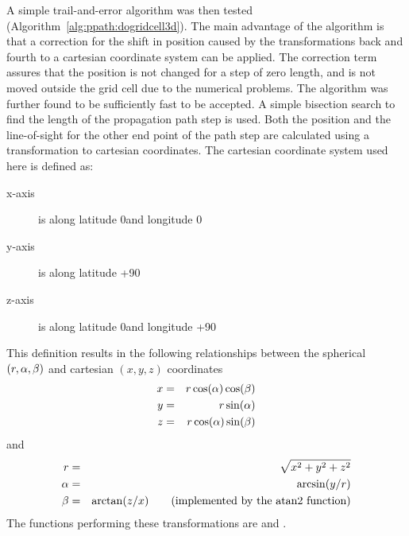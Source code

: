 A simple trail-and-error algorithm was then tested
(Algorithm~\ref{alg:ppath:dogridcell3d}). The main advantage of the
algorithm is that a correction for the shift in position caused by the
transformations back and fourth to a cartesian coordinate system can
be applied. The correction term assures that the position is not
changed for a step of zero length, and is not moved outside the grid
cell due to the numerical problems. The algorithm was further found to
be sufficiently fast to be accepted. A simple bisection search to find
the length of the propagation path step is used. Both the position and
the line-of-sight for the other end point of the path step are
calculated using a transformation to cartesian coordinates.  The
cartesian coordinate system used here is defined as:
\begin{description}
\item[x-axis] is along latitude 0\degree and longitude 0\degree
\item[y-axis] is along latitude +90\degree
\item[z-axis] is along latitude 0\degree and longitude +90\degree
\end{description}
This definition results in the following relationships between the
spherical $(r,\alpha,\beta)$ and cartesian $(x,y,z)$ coordinates
\begin{eqnarray}
  x &=& r \cos(\alpha) \cos(\beta) \nonumber \\
  y &=& r \sin(\alpha)            \\
  z &=& r \cos(\alpha) \sin(\beta) \nonumber
 \label{eq:ppath:sph2cart}
\end{eqnarray}
and
\begin{eqnarray}
  \Rds &=& \sqrt{x^2+y^2+z^2}  \nonumber  \\
  \Lat &=& \arcsin(y/\Rds)                \\
  \Lon &=& \arctan(z/x) \qquad \mathrm{(implemented\ by\ the\ atan2\ function)}
                               \nonumber
 \label{eq:ppath:cart2sph}
\end{eqnarray}
The functions performing these transformations are  and
.

